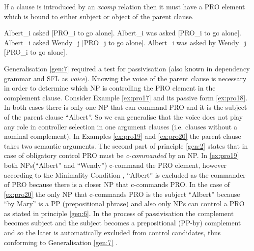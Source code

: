     \begin{generalization}\label{gen:10}
    	If a clause is introduced by an \textit{xcomp} relation then it must have a PRO element which is bound to either subject or object of the parent clause.
    \end{generalization}

    \begin{exe}
    	\ex\label{ex:pro17} Albert_i asked [PRO_i to go alone].
    	\ex\label{ex:pro18} Albert_i was asked [PRO_i to go alone].
    	\ex\label{ex:pro19} Albert_i asked Wendy_j [PRO_j to go alone].
    	\ex\label{ex:pro20} Albert_i was asked by Wendy_j [PRO_i to go alone].
    \end{exe}


    Generalisation \ref{gen:7} required a test for passivisation (also known in dependency grammar and SFL as \textit{voice}). Knowing the voice of the parent clause is necessary in order to determine which NP is controlling the PRO element in the complement clause. Consider Example \ref{ex:pro17} and its passive form \ref{ex:pro18}. In both cases there is only one NP that can command PRO and it is the subject of the parent clause ``Albert''. So we can generalise that the voice does not play any role in controller selection in one argument clauses (i.e. clauses without a nominal complement). In Examples \ref{ex:pro19} and \ref{ex:pro20} the parent clause takes two semantic arguments. The second part of principle \ref{gen:2} states that in case of obligatory control PRO must be \textit{c-commanded} by an NP. In \ref{ex:pro19} both NPs(``Albert'' and ``Wendy'') c-command the PRO element, however according to the Minimality Condition \citep[479]{Haegeman1991}, ``Albert'' is excluded as the commander of PRO because there is a closer NP that c-commands PRO. In the case of \ref{ex:pro20} the only NP that c-commands PRO is the subject ``Albert'' because ``by Mary'' is a PP (prepositional phrase) and also only NPs can control a PRO as stated in principle \ref{gen:6}. In the process of passivisation the complement becomes subject and the subject becomes a prepositional (PP-by) complement and so the later is automatically excluded from control candidates, thus conforming to Generalisation \ref{gen:7} \citep[281]{Haegeman1991}. 

